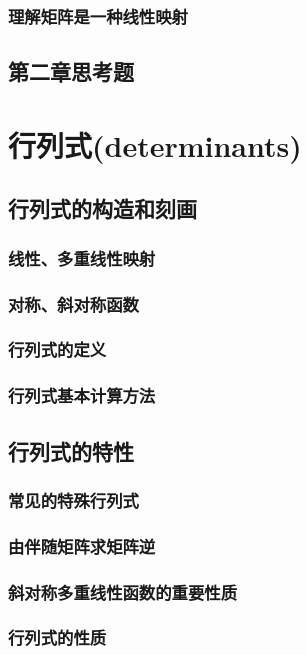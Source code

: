 \documentclass[zihao=-4,UTF8]{report}
\begin{document}
\subsection{理解矩阵是一种线性映射}

\section{第二章思考题}

\chapter{行列式(determinants)}
\thispagestyle{fancy} 
\section{行列式的构造和刻画}
\subsection{线性、多重线性映射}
\subsection{对称、斜对称函数}
\subsection{行列式的定义}
\subsection{行列式基本计算方法}

\section{行列式的特性}
\subsection{常见的特殊行列式}
\subsection{由伴随矩阵求矩阵逆}
\subsection{斜对称多重线性函数的重要性质}
\subsection{行列式的性质}
\end{document}
